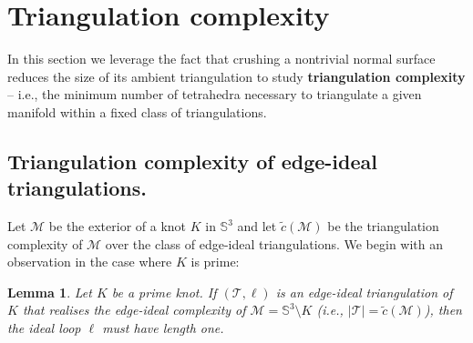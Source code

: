 \documentclass[10pt,a4paper]{amsart}
\newtheorem{lemma}[theorem]{Lemma}
\newcommand{\tri}{\mathcal{T}}
\newcommand{\manifold}{\mathcal{M}}
\begin{document}
\section{Triangulation complexity}\label{sec:further}

In this section we leverage the fact that crushing a nontrivial normal surface reduces the size of its ambient triangulation to study \textbf{triangulation complexity} --
i.e., the minimum number of tetrahedra necessary to triangulate a given manifold within a fixed class of triangulations.

\subsection{Triangulation complexity of edge-ideal triangulations.}

Let $\mathcal{M}$ be the exterior of a knot $K$ in $\mathbb{S}^3$ and let $\tilde{c}(\mathcal{M})$ be the triangulation complexity of $\mathcal{M}$ over the class of edge-ideal triangulations.
We begin with an observation in the case where $K$ is prime:

\begin{lemma}\label{lem:minEdgeIdealPrime}
Let $K$ be a prime knot. If $(\tri,\ell)$ is an edge-ideal triangulation of $K$ that
realises the edge-ideal complexity of $\manifold = \mathbb{S}^3\setminus K$ (i.e.,
$|\tri| = \tilde{c}(\mathcal{M})$), then the ideal loop $\ell$ must have length one.
\end{lemma}
\end{document}
